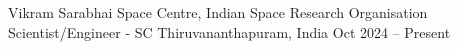 


\begin{cventries}

    \cventry
    {Vikram Sarabhai Space Centre, Indian Space Research Organisation} %
    {Scientist/Engineer - SC} %
    {Thiruvananthapuram, India} %
    {Oct 2024 -- Present} %
    {}

\end{cventries}


